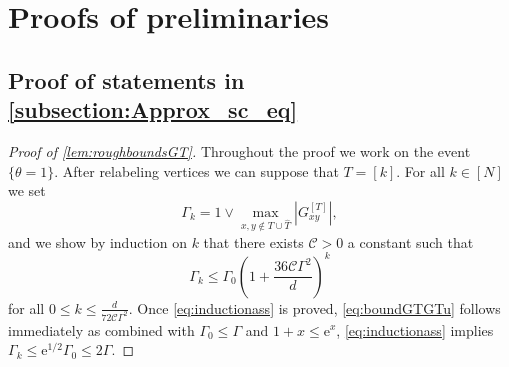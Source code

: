 \documentclass[11pt]{article}
\newcommand{\abs}[1]{\left| #1 \right|}
\theoremstyle{plain}
\theoremstyle{remark}
\numberwithin{equation}{section}
\newcommand*\bset[1]{[#1]}
\newcommand*\ubarr[1]{{\widehat{#1}}}
\begin{document}
	
	\section{Proofs of preliminaries} 
	
	\subsection{Proof of statements in \cref{subsection:Approx_sc_eq} }\label{subsection:proofs_approx_sc}
		\begin{proof}[Proof of \cref{lem:roughboundsGT}]
		Throughout the proof we work on the event $\{\theta =1\}$. After relabeling vertices we can suppose that $T= [k]$. For all $k \in [N]$ we set 
		$$\Gamma_k = 1 \vee  \max_{x,y \notin T \cup \ubarr{T}} \abs{G^{\bset{T}}_{xy}}, $$
		and we show by induction on $k$ that there exists $\mathcal{C} >0 $ a constant such that
		\begin{equation}\label{eq:inductionass}
			\Gamma_k \le \Gamma_0 \left( 1 + \frac{ 36 \mathcal{C}\Gamma^2}{d}\right)^k
		\end{equation}
		for all $0 \le k \le \frac{d}{ 72 \mathcal{C}\Gamma^2}$. 
		Once \cref{eq:inductionass} is proved, \cref{eq:boundGTGTu} follows immediately as combined with $\Gamma_0 \le \Gamma$ and $1+ x \le \mathrm{e}^x$, \cref{eq:inductionass} implies $\Gamma_k \le \mathrm{e}^{1/2} \Gamma_0 \le 2 \Gamma$.
		

\end{proof}
\end{document}
